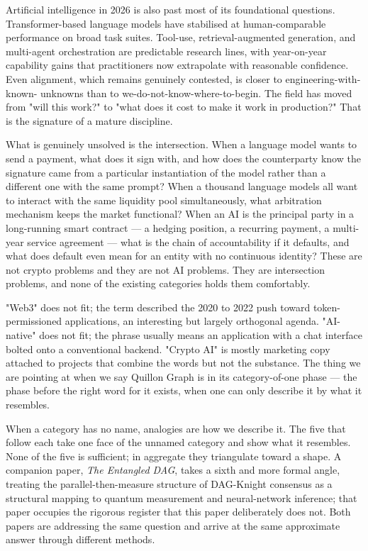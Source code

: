 \documentclass[11pt,a4paper]{article}
\begin{document}
Artificial intelligence in 2026 is also past most of its foundational
questions. Transformer-based language models have stabilised at
human-comparable performance on broad task suites. Tool-use,
retrieval-augmented generation, and multi-agent orchestration are
predictable research lines, with year-on-year capability gains that
practitioners now extrapolate with reasonable confidence. Even alignment,
which remains genuinely contested, is closer to engineering-with-known-
unknowns than to we-do-not-know-where-to-begin. The field has moved from
"will this work?" to "what does it cost to make it work in production?"
That is the signature of a mature discipline.

What is genuinely unsolved is the intersection. When a language model
wants to send a payment, what does it sign with, and how does the
counterparty know the signature came from a particular instantiation of
the model rather than a different one with the same prompt? When a
thousand language models all want to interact with the same liquidity
pool simultaneously, what arbitration mechanism keeps the market
functional? When an AI is the principal party in a long-running smart
contract --- a hedging position, a recurring payment, a multi-year
service agreement --- what is the chain of accountability if it defaults,
and what does default even mean for an entity with no continuous
identity? These are not crypto problems and they are not AI problems.
They are intersection problems, and none of the existing categories
holds them comfortably.

"Web3" does not fit; the term described the 2020 to 2022 push toward
token-permissioned applications, an interesting but largely orthogonal
agenda. "AI-native" does not fit; the phrase usually means an application
with a chat interface bolted onto a conventional backend. "Crypto AI" is
mostly marketing copy attached to projects that combine the words but not
the substance. The thing we are pointing at when we say Quillon Graph is
in its category-of-one phase --- the phase before the right word for it
exists, when one can only describe it by what it resembles.

When a category has no name, analogies are how we describe it. The five
that follow each take one face of the unnamed category and show what it
resembles. None of the five is sufficient; in aggregate they triangulate
toward a shape. A companion paper, \emph{The Entangled DAG}, takes a
sixth and more formal angle, treating the parallel-then-measure structure
of DAG-Knight consensus as a structural mapping to quantum measurement
and neural-network inference; that paper occupies the rigorous register
that this paper deliberately does not. Both papers are addressing the
same question and arrive at the same approximate answer through different
methods.
\end{document}
